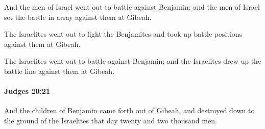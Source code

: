 			\begin{versebox}
					\item[BHS] 
					\item[ASV] And the men of Israel went out to battle against Benjamin; and the men of Israel set the battle in array against them at Gibeah.
					\item[NIV] The Israelites went out to fight the Benjamites and took up battle positions against them at Gibeah.
					\item[NRSV] The Israelites went out to battle against Benjamin; and the Israelites drew up the battle line against them at Gibeah.
			\end{versebox}

		\paragraph{Judges 20:21} %
			\label{JUDGES-20-21}

			And the children of Benjamin came forth out of Gibeah, and destroyed down to the ground of the Israelites that day twenty and two thousand men.

